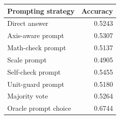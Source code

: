 \begin{tabular}{lr}
\toprule
Prompting strategy & Accuracy \\
\midrule
Direct answer & 0.5243 \\
Axis-aware prompt & 0.5307 \\
Math-check prompt & 0.5137 \\
Scale prompt & 0.4905 \\
Self-check prompt & 0.5455 \\
Unit-guard prompt & 0.5180 \\
Majority vote & 0.5264 \\
Oracle prompt choice & 0.6744 \\
\bottomrule
\end{tabular}
